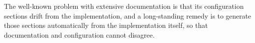 \documentclass{article}
\begin{document}
The well-known problem with extensive documentation is that its configuration
sections drift from the implementation, and a long-standing remedy is to generate
those sections automatically from the implementation itself, so that documentation
and configuration cannot disagree.
\end{document}
